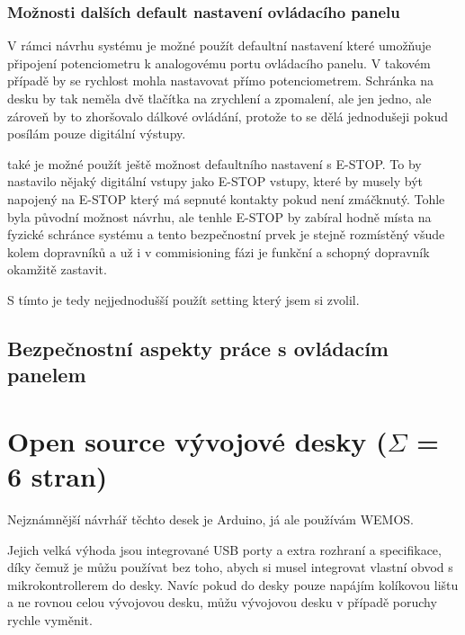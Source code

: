 \subsubsection{Možnosti dalších default nastavení ovládacího panelu}

V rámci návrhu systému je možné použít defaultní nastavení které umožňuje připojení potenciometru k analogovému portu ovládacího panelu. V takovém případě by se rychlost mohla nastavovat přímo potenciometrem. Schránka na desku by tak neměla dvě tlačítka na zrychlení a zpomalení, ale jen jedno, ale zároveň by to zhoršovalo dálkové ovládání, protože to se dělá jednodušeji pokud posílám pouze digitální výstupy.

také je možné použít ještě možnost defaultního nastavení s E-STOP. To by nastavilo nějaký digitální vstupy jako E-STOP vstupy, které by musely být napojený na E-STOP který má sepnuté kontakty pokud není zmáčknutý. Tohle byla původní možnost návrhu, ale tenhle E-STOP by zabíral hodně místa na fyzické schránce systému a tento bezpečnostní prvek je stejně rozmístěný všude kolem dopravníků a už i v commisioning fázi je funkční a schopný dopravník okamžitě zastavit.

S tímto je tedy nejjednodušší použít setting který jsem si zvolil.

\subsection{Bezpečnostní aspekty práce s ovládacím panelem}

\section{Open source vývojové desky ($\Sigma$ = 6 stran)}

Nejznámnější návrhář těchto desek je Arduino, já ale používám WEMOS.

Jejich velká výhoda jsou integrované USB porty a extra rozhraní a specifikace, díky čemuž je můžu používat bez toho, abych si musel integrovat vlastní obvod s mikrokontrollerem do desky. Navíc pokud do desky pouze napájím kolíkovou lištu a ne rovnou celou vývojovou desku, můžu vývojovou desku v případě poruchy rychle vyměnit.

